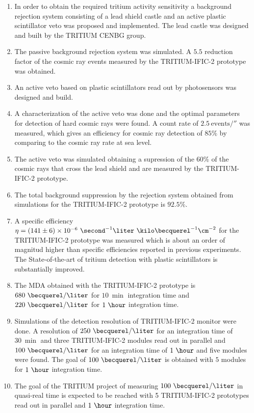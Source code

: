 \begin{enumerate}
\item{} In order to obtain the required tritium activity sensitivity a background rejection system consisting of a lead shield castle and an active plastic scintillator veto was proposed and implemented. The lead castle was designed and built by the TRITIUM CENBG group.

\item{} The passive background rejection system was simulated. A $5.5$ reduction factor of the cosmic ray events measured by the TRITIUM-IFIC-2 prototype was obtained.

\item{} An active veto based on plastic scintillators read out by photosensors was designed and build.

\item{} A characterization of the active veto was done and the optimal parameters for detection of hard cosmic rays were found. A count rate of $2.5~\text{events}/\second$ was measured, which gives an efficiency for cosmic ray detection of $85\%$ by comparing to the cosmic ray rate at sea level.

\item{} The active veto was simulated obtaining a supression of the $60\%$ of the cosmic rays that cross the lead shield and are measured by the TRITIUM-IFIC-2 prototype.

\item{} The total background suppression by the rejection system obtained from simulations for the TRITIUM-IFIC-2 prototype is $92.5\%$.

\item{} A specific efficiency $\eta = (141 \pm 6) \times 10^{-6}~ \second^{-1}  \liter ~ \kilo\becquerel^{-1} \cm^{-2}$ for the TRITIUM-IFIC-2  prototype was measured which is about an order of magnitud higher than specific efficiencies reported in previous experiments. The State-of-the-art of tritium detection with plastic scintillators is substantially improved.

\item{} The MDA obtained with the TRITIUM-IFIC-2 prototype is $680~\becquerel/\liter$  for $10~\min$ integration time and $220~\becquerel/\liter$  for $1~\hour$ integration time.

\item{} Simulations of the detection resolution of TRITIUM-IFIC-2 monitor were done. A resolution of $250~\becquerel/\liter$ for an integration time of $30~\min$ and three TRITIUM-IFIC-2 modules read out in parallel and $100~\becquerel/\liter$ for an integration time of $1~\hour$ and five modules were found. The goal of $100~\becquerel/\liter$ is obtained with $5$ modules for $1~\hour$ integration time.

\item{} The goal of the TRITIUM project of measuring $100~\becquerel/\liter$ in quasi-real time is expected to be reached with 5 TRITIUM-IFIC-2 prototypes read out in parallel and $1~\hour$ integration time.

\end{enumerate}

